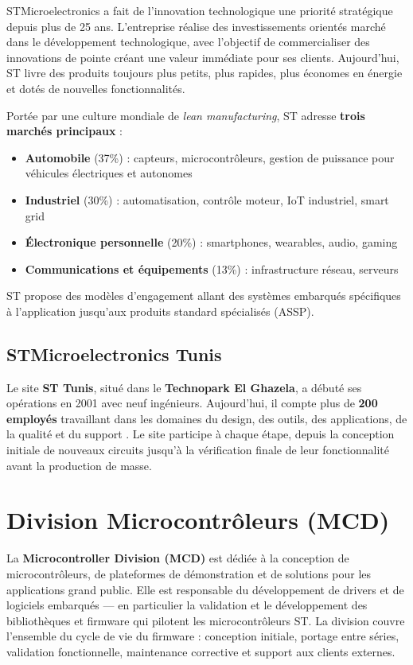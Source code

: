 \documentclass[12pt,a4paper]{report}
\begin{document}
STMicroelectronics a fait de l'innovation technologique une priorité stratégique depuis plus de 25 ans. L'entreprise réalise des investissements orientés marché dans le développement technologique, avec l'objectif de commercialiser des innovations de pointe créant une valeur immédiate pour ses clients. Aujourd'hui, ST livre des produits toujours plus petits, plus rapides, plus économes en énergie et dotés de nouvelles fonctionnalités.

Portée par une culture mondiale de \textit{lean manufacturing}, ST adresse \textbf{trois marchés principaux} :
\begin{itemize}
  \item \textbf{Automobile} (37\%) : capteurs, microcontrôleurs, gestion de puissance pour véhicules électriques et autonomes
  \item \textbf{Industriel} (30\%) : automatisation, contrôle moteur, IoT industriel, smart grid
  \item \textbf{Électronique personnelle} (20\%) : smartphones, wearables, audio, gaming
  \item \textbf{Communications et équipements} (13\%) : infrastructure réseau, serveurs
\end{itemize}

ST propose des modèles d'engagement allant des systèmes embarqués spécifiques à l'application jusqu'aux produits standard spécialisés (ASSP).

\subsection{STMicroelectronics Tunis}
\label{sec:st_tunis}

Le site \textbf{ST Tunis}, situé dans le \textbf{Technopark El Ghazela}, a débuté ses opérations en 2001 avec neuf ingénieurs. Aujourd'hui, il compte plus de \textbf{200 employés} travaillant dans les domaines du design, des outils, des applications, de la qualité et du support \cite{st_annual_report}. Le site participe à chaque étape, depuis la conception initiale de nouveaux circuits jusqu'à la vérification finale de leur fonctionnalité avant la production de masse.

\section{Division Microcontrôleurs (MCD)}
\label{sec:mcd}

La \textbf{Microcontroller Division (MCD)} est dédiée à la conception de microcontrôleurs, de plateformes de démonstration et de solutions pour les applications grand public. Elle est responsable du développement de drivers et de logiciels embarqués --- en particulier la validation et le développement des bibliothèques et firmware qui pilotent les microcontrôleurs ST. La division couvre l'ensemble du cycle de vie du firmware : conception initiale, portage entre séries, validation fonctionnelle, maintenance corrective et support aux clients externes.
\end{document}
